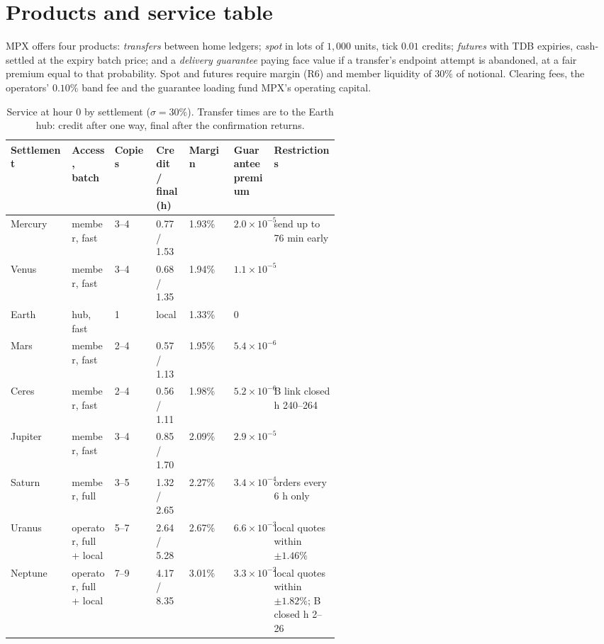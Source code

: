 \documentclass[11pt]{article}
\theoremstyle{definition}
\theoremstyle{remark}
\begin{document}
\section{Products and service table}\label{sec:service}
MPX offers four products: \emph{transfers} between home ledgers; \emph{spot} in lots of $1{,}000$ units, tick $0.01$ credits; \emph{futures} with TDB expiries, cash-settled at the expiry batch price; and a \emph{delivery guarantee} paying face value if a transfer's endpoint attempt is abandoned, at a fair premium equal to that probability. Spot and futures require margin (R6) and member liquidity of $30\%$ of notional. Clearing fees, the operators' $0.10\%$ band fee and the guarantee loading fund MPX's operating capital.
\begin{table}[H]
\centering
\caption{Service at hour 0 by settlement ($\sigma=30\%$). Transfer times are to the Earth hub: credit after one way, final after the confirmation returns.}\label{tab:service}
\small
\begin{tabular}{@{}lp{0.13\linewidth}lp{0.1\linewidth}lp{0.11\linewidth}p{0.2\linewidth}@{}}
\toprule
Settlement & Access, batch & Copies & Credit / final (h) & Margin & Guarantee premium & Restrictions \\
\midrule
Mercury & member, fast & 3--4 & 0.77 / 1.53 & 1.93\% & $2.0\times10^{-5}$ & send up to 76 min early \\
Venus & member, fast & 3--4 & 0.68 / 1.35 & 1.94\% & $1.1\times10^{-5}$ & \\
Earth & hub, fast & 1 & local & 1.33\% & 0 & \\
Mars & member, fast & 2--4 & 0.57 / 1.13 & 1.95\% & $5.4\times10^{-6}$ & \\
Ceres & member, fast & 2--4 & 0.56 / 1.11 & 1.98\% & $5.2\times10^{-6}$ & B link closed h 240--264 \\
Jupiter & member, fast & 3--4 & 0.85 / 1.70 & 2.09\% & $2.9\times10^{-5}$ & \\
Saturn & member, full & 3--5 & 1.32 / 2.65 & 2.27\% & $3.4\times10^{-4}$ & orders every 6 h only \\
Uranus & operator, full + local & 5--7 & 2.64 / 5.28 & 2.67\% & $6.6\times10^{-3}$ & local quotes within $\pm1.46\%$ \\
Neptune & operator, full + local & 7--9 & 4.17 / 8.35 & 3.01\% & $3.3\times10^{-2}$ & local quotes within $\pm1.82\%$; B closed h 2--26 \\
\bottomrule
\end{tabular}
\end{table}
\vspace{-6pt}
\end{document}
